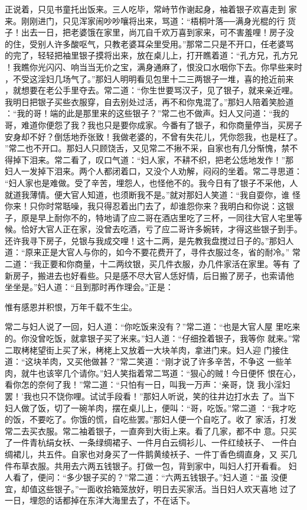 正说着，只见书童托出饭来。三人吃毕，常峙节作谢起身，袖着银子欢喜走到
家来。刚刚进门，只见浑家闹吵吵嚷将出来，骂道：“梧桐叶落──满身光棍的行
货子！出去一日，把老婆饿在家里，尚兀自千欢万喜到家来，可不害羞哩！房子没
的住，受别人许多酸呕气，只教老婆耳朵里受用。”那常二只是不开口，任老婆骂
的完了，轻轻把袖里银子摸将出来，放在桌儿上，打开瞧着道：“孔方兄，孔方兄
！我瞧你光闪闪、响当当无价之宝，满身通麻了，恨没口水咽你下去。你早些来时
，不受这淫妇几场气了。”那妇人明明看见包里十二三两银子一堆，喜的抢近前来
，就想要在老公手里夺去。常二道：“你生世要骂汉子，见了银子，就来亲近哩。
我明日把银子买些衣服穿，自去别处过活，再不和你鬼混了。”那妇人陪着笑脸道
：“我的哥！端的此是那里来的这些银子？”常二也不做声。妇人又问道：“我的
哥，难道你便怨了我？我也只是要你成家。今番有了银子，和你商量停当，买房子
安身却不好？倒恁地乔张致！我做老婆的，不曾有失花儿，凭你怨我，也是枉了。
”常二也不开口。那妇人只顾饶舌，又见常二不揪不采，自家也有几分惭愧，禁不
得掉下泪来。常二看了，叹口气道：“妇人家，不耕不织，把老公恁地发作！”那
妇人一发掉下泪来。两个人都闭着口，又没个人劝解，闷闷的坐着。常二寻思道：
“妇人家也是难做。受了辛苦，埋怨人，也怪他不的。我今日有了银子不采他，人
就道我薄情。便大官人知道，也须断我不是。”就对那妇人笑道：“我自耍你，谁
怪你来！只你时常聒噪，我只得忍着出门去了，却谁怨你来？我明白和你说：这银
子，原是早上耐你不的，特地请了应二哥在酒店里吃了三杯，一同往大官人宅里等
候。恰好大官人正在家，没曾去吃酒，亏了应二哥许多婉转，才得这些银子到手。
还许我寻下房子，兑银与我成交哩！这十二两，是先教我盘搅过日子的。”那妇人
道：“原来正是大官人与你的，如今不要花费开了，寻件衣服过冬，省的耐冷。”
常二道：“我正要和你商量，十二两纹银，买几件衣服，办几件家活在家里。等有
了新房子，搬进去也好看些。只是感不尽大官人恁好情，后日搬了房子，也索请他
坐坐是。”妇人道：“且到那时再作理会。”正是：

惟有感恩并积恨，万年千载不生尘。

常二与妇人说了一回，妇人道：“你吃饭来没有？”常二道：“也是大官人屋
里吃来的。你没曾吃饭，就拿银子买了米来。”妇人道：“仔细拴着银子，我等你
就来。”常二取栲栳望街上买了米，栲栳上又放着一大块羊肉，拿进门来。妇人迎
门接住道：“这块羊肉，又买他做甚？”常二笑道：“刚才说了许多辛苦，不争这
一些羊肉，就牛也该宰几个请你。”妇人笑指着常二骂道：“狠心的贼！今日便怀
恨在心，看你怎的奈何了我！”常二道：“只怕有一日，叫我一万声：‘亲哥，饶
我小淫妇罢！’我也只不饶你哩。试试手段看！”那妇人听说，笑的往井边打水去
了。当下妇人做了饭，切了一碗羊肉，摆在桌儿上，便叫：“哥，吃饭。”常二道
：“我才吃的饭，不要吃了。你饿的慌，自吃些罢。”那妇人便一个自吃了。收了
家活，打发常二去买衣服。常二袖着银子，一直奔到大街上来。看了几家，都不中
意。只买了一件青杭绢女袄、一条绿绸裙子、一件月白云绸衫儿、一件红绫袄子、
一件白绸裙儿，共五件。自家也对身买了一件鹅黄绫袄子、一件丁香色绸直身，又
买几件布草衣服。共用去六两五钱银子。打做一包，背到家中，叫妇人打开看看。
妇人看了，便问：“多少银子买的？”常二道：“六两五钱银子。”妇人道：“虽
没便宜，却值这些银子。”一面收拾箱笼放好，明日去买家活。当日妇人欢天喜地
过了一日，埋怨的话都掉在东洋大海里去了，不在话下。

